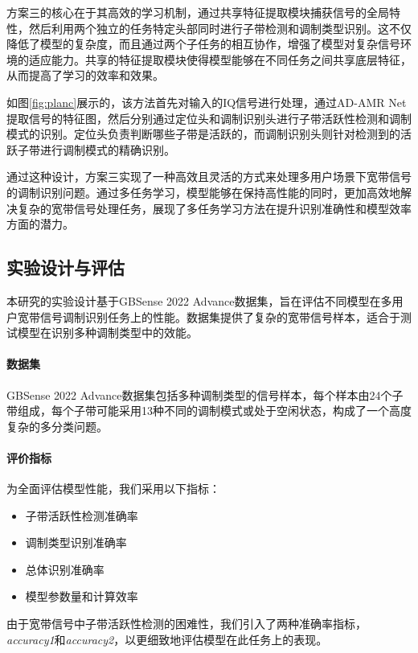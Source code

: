 方案三的核心在于其高效的学习机制，通过共享特征提取模块捕获信号的全局特性，然后利用两个独立的任务特定头部同时进行子带检测和调制类型识别。这不仅降低了模型的复杂度，而且通过两个子任务的相互协作，增强了模型对复杂信号环境的适应能力。共享的特征提取模块使得模型能够在不同任务之间共享底层特征，从而提高了学习的效率和效果。

如图\ref{fig:planc}展示的，该方法首先对输入的IQ信号进行处理，通过AD-AMR Net提取信号的特征图，然后分别通过定位头和调制识别头进行子带活跃性检测和调制模式的识别。定位头负责判断哪些子带是活跃的，而调制识别头则针对检测到的活跃子带进行调制模式的精确识别。

通过这种设计，方案三实现了一种高效且灵活的方式来处理多用户场景下宽带信号的调制识别问题。通过多任务学习，模型能够在保持高性能的同时，更加高效地解决复杂的宽带信号处理任务，展现了多任务学习方法在提升识别准确性和模型效率方面的潜力。


\subsection{实验设计与评估}\label{sec:experiment_design_evaluation}

本研究的实验设计基于GBSense 2022 Advance数据集，旨在评估不同模型在多用户宽带信号调制识别任务上的性能。数据集提供了复杂的宽带信号样本，适合于测试模型在识别多种调制类型中的效能。

\paragraph{数据集} GBSense 2022 Advance数据集包括多种调制类型的信号样本，每个样本由24个子带组成，每个子带可能采用13种不同的调制模式或处于空闲状态，构成了一个高度复杂的多分类问题。

\paragraph{评价指标} 为全面评估模型性能，我们采用以下指标：
\begin{itemize}
    \item 子带活跃性检测准确率
    \item 调制类型识别准确率
    \item 总体识别准确率
    \item 模型参数量和计算效率
\end{itemize}

由于宽带信号中子带活跃性检测的困难性，我们引入了两种准确率指标，\textit{accuracy1}和\textit{accuracy2}，以更细致地评估模型在此任务上的表现。

